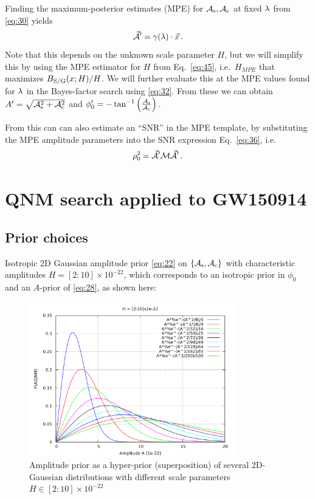 \documentclass[aps,prd,onecolumn,notitlepage,nofootinbib,superscriptaddress,altaffilletter,floatfix]{revtex4-1}
\begin{document}
Finding the maximum-posterior estimates (MPE) for $\mathcal{A}_{\mathrm{s}},\mathcal{A}_{\mathrm{c}}$ at fixed $\lambda$ from \eqref{eq:30} yields
\begin{equation}
  \label{eq:31}
  \vec{\mathcal{A}}' = \gamma(\lambda)\cdot\vec{x}\,.
\end{equation}
Note that this depends on the unknown scale parameter $H$, but we will simplify this by using the MPE estimator for $H$ from Eq.~\eqref{eq:45}, i.e.\
$H_{MPE}$ that maximizes  $B_{\mathrm{S/G}}(x;H) / H$.
We will further evaluate this at the MPE values found for $\lambda$ in the Bayes-factor search using \eqref{eq:32}.
From these we can obtain $A' = \sqrt{\mathcal{A}_{\mathrm{s}}^2+\mathcal{A}_{\mathrm{c}}^2}$ and $\phi_0' = - \tan^{-1}\left(\frac{\mathcal{A}_{\mathrm{s}}}{\mathcal{A}_{\mathrm{c}}}\right)$.

From this can can also estimate an ``SNR'' in the MPE template, by substituting the MPE amplitude parameters into the SNR expression
Eq.~\eqref{eq:36}, i.e.\
\begin{equation}
  \label{eq:20}
  \rho_0^2 = \vec{\mathcal{A}}'\mathcal{M}\vec{\mathcal{A}}'\,.
\end{equation}

\section{QNM search applied to GW150914}
\label{sec:qnm-search-applied}

\subsection{Prior choices}
\label{sec:prior-choices}

Isotropic 2D Gaussian amplitude prior \eqref{eq:22} on $\{\mathcal{A}_{\mathrm{s}},\mathcal{A}_{\mathrm{c}}\}$ with characteristic amplitudes $H = [2 : 10]\times10^{-22}$, which corresponds to
an isotropic prior in $\phi_0$ and an $A$-prior of \eqref{eq:28}, as shown here:
\begin{figure}[htbp]
  \centering
  \includegraphics[width=0.8\textwidth]{prior_A.pdf}
  \caption{Amplitude prior as a hyper-prior (superposition) of several 2D-Gaussian distributions with different scale parameters $H\in{[2:10]}\times10^{-22}$}
  \label{fig:AmpPrior}
\end{figure}
\end{document}
